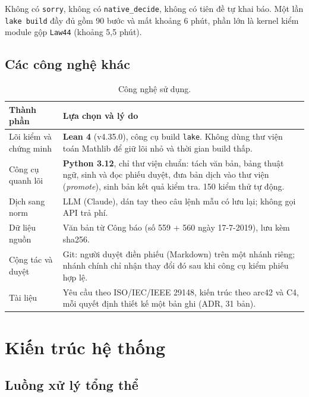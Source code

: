 \documentclass[12pt,a4paper]{article}
\newcommand{\code}[1]{\texttt{#1}}
\begin{document}
Không có \code{sorry}, không có \code{native\_decide}, không có tiên đề tự khai báo. Một lần \code{lake build} đầy đủ gồm 90 bước
và mất khoảng 6 phút, phần lớn là kernel kiểm module gộp \code{Law44} (khoảng 5,5 phút).

\subsection{Các công nghệ khác}

\begin{table}[H]
\centering\small
\caption{Công nghệ sử dụng.}
\begin{tabularx}{\textwidth}{>{\raggedright\arraybackslash}p{3.6cm}L}
\toprule
Thành phần & Lựa chọn và lý do\\
\midrule
Lõi kiểm và chứng minh & \textbf{Lean 4} (v4.35.0), công cụ build \code{lake}. Không dùng thư viện toán Mathlib để
giữ lõi nhỏ và thời gian build thấp.\\
Công cụ quanh lõi & \textbf{Python 3.12}, chỉ thư viện chuẩn: tách văn bản, bảng thuật ngữ, sinh và đọc phiếu duyệt, đưa
bản dịch vào thư viện (\emph{promote}), sinh bản kết quả kiểm tra. 150 kiểm thử tự động.\\
Dịch sang norm & LLM (Claude), dán tay theo câu lệnh mẫu có lưu lại; không gọi API trả phí.\\
Dữ liệu nguồn & Văn bản từ Công báo (số 559 + 560 ngày 17-7-2019), lưu kèm sha256.\\
Cộng tác và duyệt & Git: người duyệt điền phiếu (Markdown) trên một nhánh riêng; nhánh chính chỉ nhận thay đổi đó sau khi
công cụ kiểm phiếu hợp lệ.\\
Tài liệu & Yêu cầu theo ISO/IEC/IEEE 29148, kiến trúc theo arc42 và C4, mỗi quyết định thiết kế một bản ghi (ADR, 31 bản).\\
\bottomrule
\end{tabularx}
\end{table}


\section{Kiến trúc hệ thống}

\subsection{Luồng xử lý tổng thể}
\end{document}
